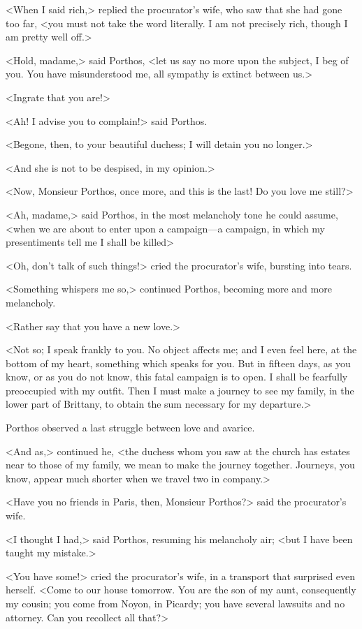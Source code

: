 <When I said rich,> replied the procurator's wife, who saw that she had gone too far, <you must not take the word literally. I am not precisely rich, though I am pretty well off.> 

<Hold, madame,> said Porthos, <let us say no more upon the subject, I beg of you. You have misunderstood me, all sympathy is extinct between us.> 

<Ingrate that you are!> 

<Ah! I advise you to complain!> said Porthos. 

<Begone, then, to your beautiful duchess; I will detain you no longer.> 

<And she is not to be despised, in my opinion.> 

<Now, Monsieur Porthos, once more, and this is the last! Do you love me still?> 

<Ah, madame,> said Porthos, in the most melancholy tone he could assume, <when we are about to enter upon a campaign—a campaign, in which my presentiments tell me I shall be killed\longdash> 

<Oh, don't talk of such things!> cried the procurator's wife, bursting into tears. 

<Something whispers me so,> continued Porthos, becoming more and more melancholy. 

<Rather say that you have a new love.> 

<Not so; I speak frankly to you. No object affects me; and I even feel here, at the bottom of my heart, something which speaks for you. But in fifteen days, as you know, or as you do not know, this fatal campaign is to open. I shall be fearfully preoccupied with my outfit. Then I must make a journey to see my family, in the lower part of Brittany, to obtain the sum necessary for my departure.> 

Porthos observed a last struggle between love and avarice. 

<And as,> continued he, <the duchess whom you saw at the church has estates near to those of my family, we mean to make the journey together. Journeys, you know, appear much shorter when we travel two in company.> 

<Have you no friends in Paris, then, Monsieur Porthos?> said the procurator's wife. 

<I thought I had,> said Porthos, resuming his melancholy air; <but I have been taught my mistake.> 

<You have some!> cried the procurator's wife, in a transport that surprised even herself. <Come to our house tomorrow. You are the son of my aunt, consequently my cousin; you come from Noyon, in Picardy; you have several lawsuits and no attorney. Can you recollect all that?> 

